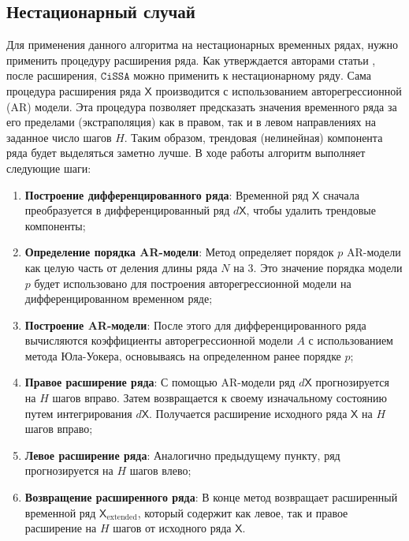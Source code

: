 \documentclass[12pt, specialist, subf
]{disser}
\theoremstyle{definition}
\newcommand{\CISSA}{\texttt{CiSSA}}
\newcommand{\TS}{\mathsf{X}}
\begin{document}
\subsection*{Нестационарный случай}
Для применения данного алгоритма на нестационарных временных рядах, нужно применить процедуру расширения ряда. Как утверждается авторами статьи \cite{bogalo2020}, после расширения, $\CISSA$ можно применить к нестационарному ряду.
Сама процедура расширения ряда $\TS$ производится с использованием авторегрессионной (AR) модели. Эта процедура позволяет предсказать значения временного ряда за его пределами (экстраполяция) как в правом, так и в левом направлениях на заданное число шагов $H$. Таким образом, трендовая (нелинейная) компонента ряда будет выделяться заметно лучше. В ходе работы алгоритм выполняет следующие шаги:
\begin{enumerate}
	\item \textbf{Построение дифференцированного ряда}:
	      Временной ряд $\TS$ сначала преобразуется в дифференцированный ряд $d \TS$, чтобы удалить трендовые компоненты;

	\item \textbf{Определение порядка AR-модели}:
	      Метод определяет порядок $p$ AR-модели как целую часть от деления длины ряда $N$ на 3. Это значение порядка модели $p$ будет использовано для построения авторегрессионной модели на дифференцированном временном ряде;


	\item \textbf{Построение AR-модели}:
	      После этого для дифференцированного ряда вычисляются коэффициенты авторегрессионной модели $A$ с использованием метода Юла-Уокера, основываясь на определенном ранее порядке $p$;

	\item \textbf{Правое расширение ряда}:
	      С помощью AR-модели ряд $d\TS$ прогнозируется на $H$ шагов вправо. Затем возвращается к своему изначальному состоянию путем интегрирования $d\TS$. Получается расширение исходного ряда $\TS$ на $H$ шагов вправо;

	\item \textbf{Левое расширение ряда}:
	      Аналогично предыдущему пункту, ряд прогнозируется на $H$ шагов влево;

	\item \textbf{Возвращение расширенного ряда}:
	      В конце метод возвращает расширенный временной ряд $\TS_{\mathrm{extended}}$, который содержит как левое, так и правое расширение на $H$ шагов от исходного ряда $\TS$.
\end{enumerate}
\end{document}
